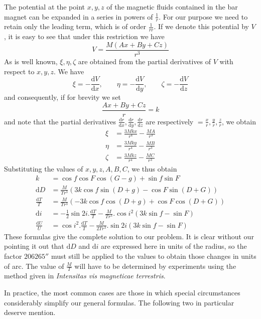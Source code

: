 The potential at the point $x,y,z$ of the magnetic fluids contained in the bar magnet can be expanded in a series in powers of $\frac1r$. For our purpose we need to retain only the leading term, which is of order $\frac{1}{rr}$. If we denote this potential by $V$, it is easy to see that under this restriction we have
\[
V=\frac{M(Ax+By+Cz)}{r^3}
\]
As is well known, $\xi,\eta,\zeta$ are obtained from the partial derivatives of $V$ with respect to $x,y,z$. We have
\[
\xi=-\frac{\mathrm{d}V}{\mathrm{d}x},\qquad\eta=-\frac{\mathrm{d}V}{\mathrm{d}y},\qquad\zeta=-\frac{\mathrm{d}V}{\mathrm{d}z}
\]
and consequently, if for brevity we set
\[
\frac{Ax+By+Cz}{r}=k
\]
and note that the partial derivatives $\frac{\mathrm{d}r}{\mathrm{d}x},\frac{\mathrm{d}r}{\mathrm{d}y},\frac{\mathrm{d}r}{\mathrm{d}z}$ are respectively $=\frac{x}{r},\frac{y}{r},\frac{z}{r}$, we obtain
\[
\begin{aligned}
\xi&=\frac{3Mkx}{r^4}-\frac{MA}{r^3}\\
\eta&=\frac{3Mky}{r^4}-\frac{MB}{r^3}\\
\zeta&=\frac{3Mkz}{r^4}-\frac{MC}{r^3}
\end{aligned}
\]
Substituting the values of $x,y,z,A,B,C$, we thus obtain
\[
\begin{aligned}
k&=\cos f\cos F\cos(G-g)+\sin f\sin F\\
\mathrm{d}D&=\frac{M}{Tr^3}(3k\cos f\sin(D+g)-\cos F\sin(D+G))\\
\frac{\mathrm{d}T}{T}&=\frac{M}{Tr^3}(-3k\cos f\cos(D+g)+\cos F\cos(D+G))\\
\mathrm{d}i&=-\tfrac12\sin2i.\frac{\mathrm{d}T}{T}-\frac{M}{Tr^3}.\cos i^2(3k\sin f-\sin F)\\
\frac{\mathrm{d}U}{U}&=\cos i^2.\frac{\mathrm{d}T}{T}-\frac{M}{2Tr^3}.\sin2i(3k\sin f-\sin F)
\end{aligned}
\]
These formulas give the complete solution to our problem. It is clear without our pointing it out that $\mathrm{d}D$ and $\mathrm{d}i$ are expressed here in units of the radius, so the factor $206265''$ must still be applied to the values to obtain those changes in units of arc. The value of $\frac{M}{T}$ will have to be determined by experiments using the method given in \textit{Intensitas vis magneticae terrestris}.

In practice, the most common cases are those in which special circumstances considerably simplify our general formulas. The following two in particular deserve mention.

